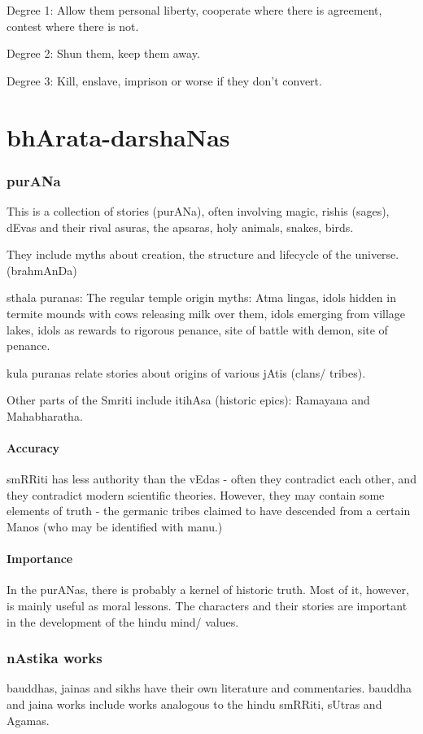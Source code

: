 \documentclass[oneside, article]{memoir}
\begin{document}
Degree 1: Allow them personal liberty, cooperate where there is agreement, contest where there is not.

Degree 2: Shun them, keep them away.

Degree 3: Kill, enslave, imprison or worse if they don't convert.

\chapter{bhArata-darshaNas}
\subsection{purANa}
This is a collection of stories (purANa), often involving magic, rishis (sages), dEvas and their rival asuras, the apsaras, holy animals, snakes, birds.

They include myths about creation, the structure and lifecycle of the universe. (brahmAnDa)

sthala puranas: The regular temple origin myths: Atma lingas, idols hidden in termite mounds with cows releasing milk over them, idols emerging from village lakes, idols as rewards to rigorous penance, site of battle with demon, site of penance.

kula puranas relate stories about origins of various jAtis (clans/ tribes).

Other parts of the Smriti include itihAsa (historic epics): Ramayana and Mahabharatha.

\subsubsection{Accuracy}
smRRiti has less authority than the vEdas - often they contradict each other, and they contradict modern scientific theories. However, they may contain some elements of truth - the germanic tribes claimed to have descended from a certain Manos (who may be identified with manu.)

\subsubsection{Importance}
In the purANas, there is probably a kernel of historic truth. Most of it, however, is mainly useful as moral lessons. The characters and their stories are important in the development of the hindu mind/ values.

\subsection{nAstika works}
bauddhas, jainas and sikhs have their own literature and commentaries. bauddha and jaina works include works analogous to the hindu smRRiti, sUtras and Agamas.
\end{document}
